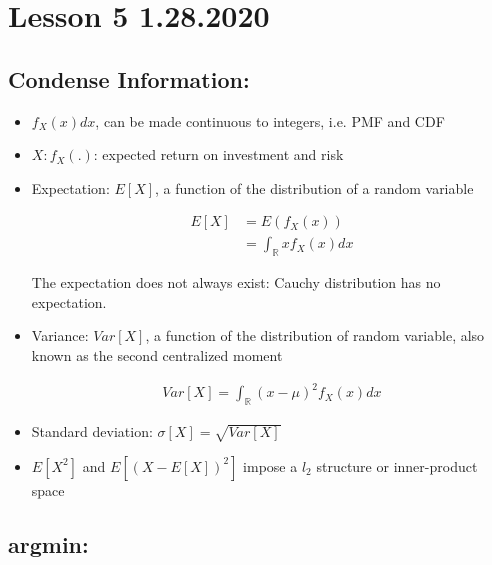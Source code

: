 \documentclass[11pt,letterpaper,titlepage]{article}
\begin{document}
\newpage

\section{Lesson 5 1.28.2020}

\subsection{Condense Information:}

\begin{itemize}

    \item $f_X(x)dx$, can be made continuous to integers, i.e. PMF and CDF
    
    \item $X: f_X(.)$: expected return on investment and risk
    
    \item Expectation: $E[X]$, a function of the distribution of a random variable
    
    \begin{equation*}
        \begin{aligned}
            E[X] &= E(f_X(x)) \\
            &= \int_\mathbb{R} x f_X(x) dx
        \end{aligned}
    \end{equation*}
    
    The expectation does not always exist: Cauchy distribution has no expectation.
    
    \item Variance: $Var[X]$, a function of the distribution of random variable, also known as the second centralized moment
    
    \begin{equation*}
        \begin{aligned}
            Var[X] = \int_\mathbb{R} (x-\mu)^2 f_X(x)dx
        \end{aligned}
    \end{equation*}
    
    \item Standard deviation: $\sigma[X] = \sqrt{Var[X]}$
    
    \item $E[X^2]$ and $E[(X - E[X])^2]$ impose a $l_2$ structure or inner-product space
\end{itemize}

\subsection{argmin:}
\end{document}
